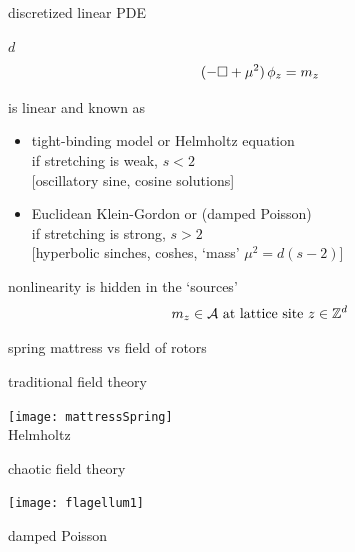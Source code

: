 \begin{frame}{discretized linear PDE}
\begin{block}{$d$\dmn\ \catlatt}
{\Large
\[
 (-\Box + {\mu}^2)\,\phi_{z} = m_z
\] %
}
\end{block}

\bigskip

is linear and known as
\begin{itemize}
\item {\color{blue}tight-binding} model or {\color{blue}Helmholtz} equation \\
if stretching is weak, $s<2$ \\
 $[$oscillatory sine, cosine solutions]
\item
Euclidean {\color{blue}Klein-Gordon} or (damped {\color{blue}Poisson})\\
if stretching is strong, $s>2$ \\
 $[$hyperbolic sinches, coshes, `{\color{blue}mass}' ${\mu}^2=d(s-2)$]
\end{itemize}
\medskip

nonlinearity is hidden in the `sources'
\[
  {m_{z}} \in \mathcal{A}
    \mbox{  at lattice site  }
  z\in \mathbb{Z}^{d}
\]
\end{frame} %

\begin{frame}{spring mattress vs field of rotors}
\begin{center}
            \begin{minipage}[c]{0.40\textwidth}\begin{center}
traditional field theory
\bigskip

\texttt{[image: mattressSpring]}\\
{\color{blue}Helmholtz}
            \end{center}\end{minipage}
            \hspace{2ex}
            \begin{minipage}[c]{0.46\textwidth}\begin{center}
chaotic field theory\\
\bigskip
\bigskip
\bigskip

\texttt{[image: flagellum1]}\\
\bigskip

damped {\color{blue}Poisson}
            \end{center}\end{minipage}
\end{center}
\end{frame} %

